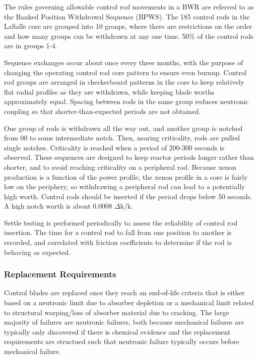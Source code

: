 \documentclass[10pt]{article}
\newcounter{subsubsubsection}[subsubsection]
\begin{document}
The rules governing allowable control rod movements in a BWR are referred to as the Banked Position Withdrawal Sequence (BPWS). The 185 control rods in the LaSalle core are grouped into 10 groups, where there are restrictions on the order and how many groups can be withdrawn at any one time. 50\% of the control rods are in groups 1-4. 



Sequence exchanges occur about once every three months, with the purpose of changing the operating control rod core pattern to ensure even burnup. Control rod groups are arranged in checkerboard patterns in the core to keep relatively flat radial profiles as they are withdrawn, while keeping blade worths approximately equal. Spacing between rods in the same group reduces neutronic coupling so that shorter-than-expected periods are not obtained. 


One group of rods is withdrawn all the way out, and another group is notched from 00 to some intermediate notch. Then, nearing criticality, rods are pulled single notches. Criticality is reached when a period of 200-300 seconds is observed. These sequences are designed to keep reactor periods longer rather than shorter, and to avoid reaching criticality on a peripheral rod. Because xenon production is a function of the power profile, the xenon profile in a core is fairly low on the periphery, so withdrawing a peripheral rod can lead to a potentially high worth. Control rods should be inserted if the period drops below 50 seconds. A high notch worth is about 0.0008 \(\Delta\)k/k. 



Settle testing is performed periodically to assess the reliability of control rod insertion. The time for a control rod to fall from one position to another is recorded, and correlated with friction coefficients to determine if the rod is behaving as expected. 



\subsubsection{Replacement Requirements}

Control blades are replaced once they reach an end-of-life criteria that is either based on a neutronic limit due to absorber depletion or a mechanical limit related to structural warping/loss of absorber material due to cracking. The large majority of failures are neutronic failures, both because mechanical failures are typically only discovered if there is chemical evidence and the replacement requirements are structued such that neutronic failure typically occurs before mechanical failure.
\end{document}
